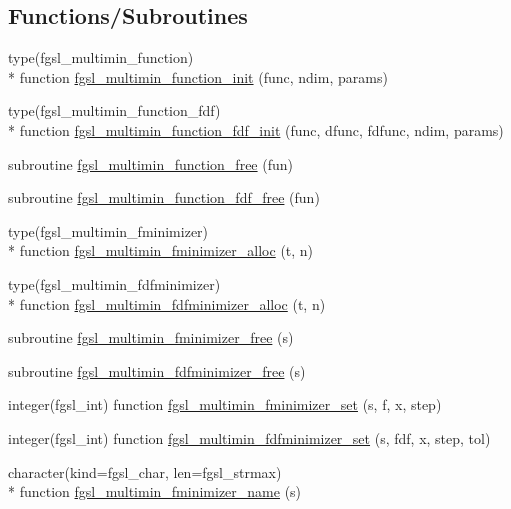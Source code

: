\subsection*{Functions/\-Subroutines}
\begin{DoxyCompactItemize}
\item 
type(fgsl\-\_\-multimin\-\_\-function) \\*
function \hyperlink{multimin_8finc_a1b777bbc4aa79d172caa92121222b5db}{fgsl\-\_\-multimin\-\_\-function\-\_\-init} (func, ndim, params)
\item 
type(fgsl\-\_\-multimin\-\_\-function\-\_\-fdf) \\*
function \hyperlink{multimin_8finc_a38c9b041ca068595cd096fb565b8b84b}{fgsl\-\_\-multimin\-\_\-function\-\_\-fdf\-\_\-init} (func, dfunc, fdfunc, ndim, params)
\item 
subroutine \hyperlink{multimin_8finc_a20359c7761d29e39ee1edbb1a7499814}{fgsl\-\_\-multimin\-\_\-function\-\_\-free} (fun)
\item 
subroutine \hyperlink{multimin_8finc_acf20d19ee20fdd349f2cb779761e15dd}{fgsl\-\_\-multimin\-\_\-function\-\_\-fdf\-\_\-free} (fun)
\item 
type(fgsl\-\_\-multimin\-\_\-fminimizer) \\*
function \hyperlink{multimin_8finc_a9572fe1c742b37999c9dfff7a0ca7ca9}{fgsl\-\_\-multimin\-\_\-fminimizer\-\_\-alloc} (t, n)
\item 
type(fgsl\-\_\-multimin\-\_\-fdfminimizer) \\*
function \hyperlink{multimin_8finc_a4e93d6fb4c774ef02bc0e256fc74f3cf}{fgsl\-\_\-multimin\-\_\-fdfminimizer\-\_\-alloc} (t, n)
\item 
subroutine \hyperlink{multimin_8finc_ab3a786c5c952d55af8c14d3197682c50}{fgsl\-\_\-multimin\-\_\-fminimizer\-\_\-free} (s)
\item 
subroutine \hyperlink{multimin_8finc_a87a418eae01978bd53b1b3d120bd7808}{fgsl\-\_\-multimin\-\_\-fdfminimizer\-\_\-free} (s)
\item 
integer(fgsl\-\_\-int) function \hyperlink{multimin_8finc_acb48fd9d43a274bac09933d5600439bf}{fgsl\-\_\-multimin\-\_\-fminimizer\-\_\-set} (s, f, x, step)
\item 
integer(fgsl\-\_\-int) function \hyperlink{multimin_8finc_a48d15a5b27f8afaf450743f443a6b4e0}{fgsl\-\_\-multimin\-\_\-fdfminimizer\-\_\-set} (s, fdf, x, step, tol)
\item 
character(kind=fgsl\-\_\-char, len=fgsl\-\_\-strmax) \\*
function \hyperlink{multimin_8finc_ac0081b18d8d21a731ab07186254e6421}{fgsl\-\_\-multimin\-\_\-fminimizer\-\_\-name} (s)

\end{DoxyCompactItemize}
